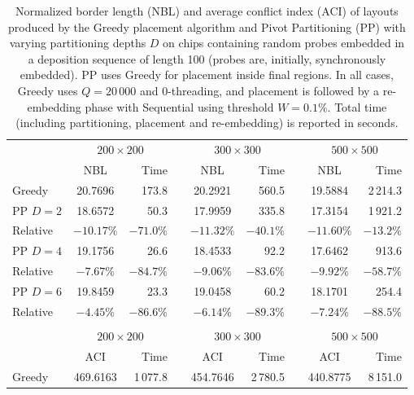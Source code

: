 \begin{table}[t!]\centering
\caption{\label{tab:pp_sync}
  Normalized border length (NBL) and average conflict index (ACI) of layouts
  produced by the Greedy placement algorithm and Pivot Partitioning (PP) with
  varying partitioning depths $D$ on chips containing random probes embedded in
  a deposition sequence of length 100 (probes are, initially, synchronously
  embedded). PP uses Greedy for placement inside final regions. In all cases,
  Greedy uses $Q=20\,000$ and $0$-threading, and placement is followed by a
  re-embedding phase with Sequential using threshold $W=0.1\%$. Total time
  (including partitioning, placement and re-embedding) is reported in seconds.}
\footnotesize{
\begin{tabular}{lcrlcrlcr}
\vspace{1pt}
 & \multicolumn{2}{c}{$200\times 200$} & & \multicolumn{2}{c}{$300\times 300$} & & \multicolumn{2}{c}{$500\times 500$} \\
\cline{2-3} \cline{5-6} \cline{8-9}
\vspace{1pt}
         & NBL      & Time    & & NBL      & Time    & & NBL      & Time       \\
\hline
Greedy   &  20.7696 & 173.8   & &  20.2921 & 560.5   & &  19.5884 & 2\,214.3   \\
\hline
PP $D=2$ &  18.6572 &  50.3   & &  17.9959 & 335.8   & &  17.3154 & 1\,921.2   \\
Relative &$-10.17\%$&$-71.0\%$& &$-11.32\%$&$-40.1\%$& &$-11.60\%$&   $-13.2\%$\\
\hline
PP $D=4$ &  19.1756 &  26.6   & &  18.4533 &  92.2   & &  17.6462 &    913.6   \\
Relative & $-7.67\%$&$-84.7\%$& & $-9.06\%$&$-83.6\%$& & $-9.92\%$&   $-58.7\%$\\
\hline
PP $D=6$ &  19.8459 &  23.3   & &  19.0458 &  60.2   & &  18.1701 &    254.4   \\
Relative & $-4.45\%$&$-86.6\%$& & $-6.14\%$&$-89.3\%$& & $-7.24\%$&   $-88.5\%$\\
\hline
\\
\vspace{1pt}
 & \multicolumn{2}{c}{$200\times 200$} & & \multicolumn{2}{c}{$300\times 300$} & & \multicolumn{2}{c}{$500\times 500$} \\
\cline{2-3} \cline{5-6} \cline{8-9}
\vspace{1pt}
         & ACI      & Time       & & ACI      & Time       & & ACI      & Time       \\
\hline
Greedy   & 469.6163 & 1\,077.8   & & 454.7646 & 2\,780.5   & & 440.8775 & 8\,151.0   \\

\end{tabular}}
\end{table}
